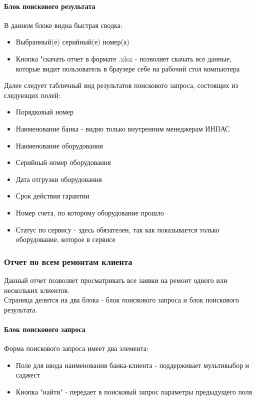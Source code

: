 \documentclass[DIV=calc, paper=a4, fontsize=11pt]{scrartcl} %
\begin{document}
\paragraph{Блок поискового результата}
В данном блоке видна быстрая сводка:

\begin{itemize}
	\item Выбранный(е) серийный(е) номер(а)
	\item Кнопка "скачать отчет в формате .xlsx - позволяет скачать все данные, которые видит пользователь в браузере себе на рабочий стол компьютера
\end{itemize}

Далее следует табличный вид результатов поискового запроса, состоящих из следующих полей:

\begin{itemize}
	\item Порядковый номер
	\item Наименование банка - видно только внутренним менеджерам ИНПАС
	\item Наименование оборудования
	\item Серийный номер оборудования
	\item Дата отгрузки оборудования
	\item Срок действия гарантии
	\item Номер счета, по которому оборудование прошло
	\item Статус по сервису - здесь обязателен, так как показывается только оборудование, которое в сервисе
\end{itemize}


\subsubsection{Отчет по всем ремонтам клиента} 
Данный отчет позволяет просматривать все заявки на ремонт одного или нескольких клиентов.
\\[0.5cm]
Страница делится на два блока - блок поискового запроса и блок поискового результата.
\paragraph{Блок поискового запроса}
Форма поискового запроса имеет два элемента:

\begin{itemize}
	\item Поле для ввода наименования банка-клиента  - поддерживает мультивыбор и саджест
	\item Кнопка "найти" - передает в поисковый запрос параметры предыдущего поля
\end{itemize}
\end{document}
